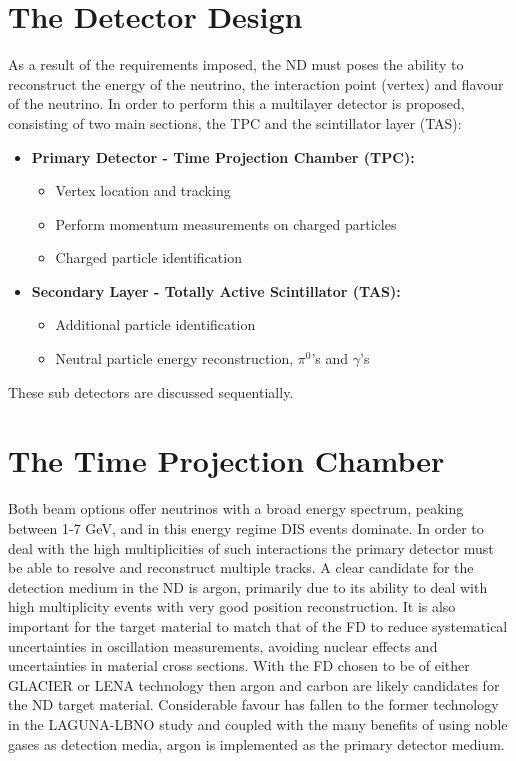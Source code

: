 \section{The Detector Design}
As a result of the requirements imposed, the ND must poses the ability to reconstruct the energy of the neutrino, the interaction point (vertex) and flavour of the neutrino. In order to perform this a multilayer detector is proposed, consisting of two main sections, the TPC and the scintillator layer (TAS):
\begin{itemize}
	\item{\textbf{Primary Detector - Time Projection Chamber (TPC):}}
	\begin{itemize}
		\item Vertex location and tracking
		\item Perform momentum measurements on charged particles
		\item Charged particle identification
	\end{itemize}
	\item{\textbf{Secondary Layer - Totally Active Scintillator (TAS):}}
	\begin{itemize}
		\item Additional particle identification
		\item Neutral particle energy reconstruction, $\pi^{0}$'s and $\gamma$'s
	\end{itemize}
\end{itemize}
These sub detectors are discussed sequentially.

\section{The Time Projection Chamber} 
Both beam options offer neutrinos with a broad energy spectrum, peaking between 1-7 GeV, and in this energy regime DIS events dominate. In order to deal with the high multiplicities of such interactions the primary detector must be able to resolve and reconstruct multiple tracks. A clear candidate for the detection medium in the ND is argon, primarily due to its ability to deal with high multiplicity events with very good position reconstruction. It is also important for the target material to match that of the FD to reduce systematical uncertainties in oscillation measurements, avoiding nuclear effects and uncertainties in material cross sections. With the FD chosen to be of either GLACIER or LENA technology then argon and carbon are likely candidates for the ND target material. Considerable favour has fallen to the former technology in the LAGUNA-LBNO study and coupled with the many benefits of using noble gases as detection media, argon is implemented as the primary detector medium. 
 

